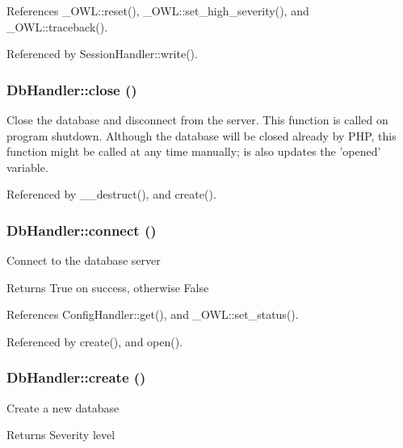 References \_\-OWL::reset(), \_\-OWL::set\_\-high\_\-severity(), and \_\-OWL::traceback().



Referenced by SessionHandler::write().

\subsubsection[{close}]{\setlength{\rightskip}{0pt plus 5cm}DbHandler::close ()}\label{classDbHandler_ad3d2853bbd2d1962710907e34afb424f}
Close the database and disconnect from the server. This function is called on program shutdown. Although the database will be closed already by PHP, this function might be called at any time manually; is also updates the 'opened' variable. 

Referenced by \_\-\_\-destruct(), and create().

\subsubsection[{connect}]{\setlength{\rightskip}{0pt plus 5cm}DbHandler::connect ()}\label{classDbHandler_a9cf52ba614981a0082063d57290d3b7c}
Connect to the database server

\begin{DoxyReturn}{Returns}
True on success, otherwise False 
\end{DoxyReturn}


References ConfigHandler::get(), and \_\-OWL::set\_\-status().



Referenced by create(), and open().

\subsubsection[{create}]{\setlength{\rightskip}{0pt plus 5cm}DbHandler::create ()}\label{classDbHandler_ac9e93cb0ab57f03b2719eebd0c0ee2ef}
Create a new database

\begin{DoxyReturn}{Returns}
Severity level 
\end{DoxyReturn}


